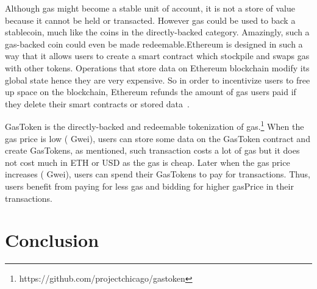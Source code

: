 Although gas might become a stable unit of account, it is not a store of value because it cannot be held or transacted. However gas could be used to back a stablecoin, much like the coins in the directly-backed category. Amazingly, such a gas-backed coin could even be made redeemable.Ethereum is designed in such a way that it allows users to create a smart contract which stockpile and swaps gas with other tokens. Operations that store data on Ethereum blockchain modify its global state hence they are very expensive. So in order to incentivize users to free up space on the blockchain, Ethereum refunds the amount of gas users paid if they delete their smart contracts or stored data~\cite{wood2014ethereum}. 

GasToken is the directly-backed and redeemable tokenization of gas.\footnote{https://github.com/projectchicago/gastoken} When the gas price is low ( Gwei), users can store some data on the GasToken contract and create GasTokens, as mentioned, such transaction costs a lot of gas but it does not cost much in ETH or USD as the gas is cheap. Later when the gas price increases ( Gwei), users can spend their GasTokens to pay for transactions. Thus, users benefit from paying for less gas and bidding for higher \textsf{gasPrice} in their transactions. 







\section{Conclusion}

